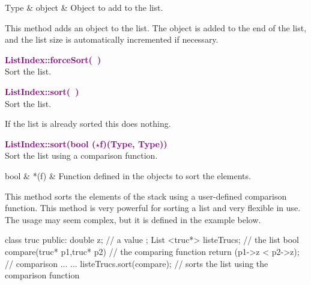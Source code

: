 \begin{tcolorbox}[width=\textwidth,myArgs,tabularx={ll|R}]
Type & object & Object to add to the list.
\end{tcolorbox}

This method adds an object to the list. The object is added to the end of the list, and the list size is automatically incremented if necessary.

\textcolor{purple}{\textbf{ListIndex::forceSort(~)}}\label{ListIndex::forceSort()}\\
Sort the list.


\textcolor{purple}{\textbf{ListIndex::sort(~)}}\label{ListIndex::sort()}\\
Sort the list.

If the list is already sorted this does nothing.

\textcolor{purple}{\textbf{ListIndex::sort(bool ($\star$f)(Type, Type))}}\label{ListIndex::sort(bool (*f)(Type, Type))}\\
Sort the list using a comparison function.

\begin{tcolorbox}[width=\textwidth,myArgs,tabularx={ll|R}]
bool & *(f) & Function defined in the objects to sort the elements.
\end{tcolorbox}

This method sorts the elements of the stack using a user-defined comparison function.
This method is very powerful for sorting a list and very flexible in use.
The usage may seem complex, but it is defined in the example below.
\begin{CppListing}
class truc
{
  public:
  double z; // a value
};
List <truc*> listeTrucs; // the list
bool compare(truc* p1,truc* p2) // the comparing function
{
  return (p1->z < p2->z); // comparison
}
...
{
...
listeTrucs.sort(compare); // sorts the list using the comparison function
}
\end{CppListing}

